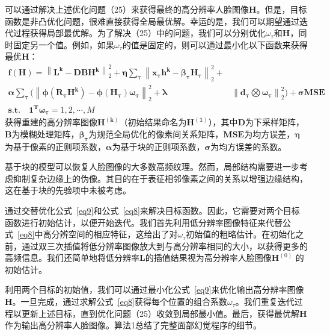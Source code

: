 可以通过解决上述优化问题（25）来获得最终的高分辨率人脸图像$\boldsymbol{H}$。但是，目标函数是非凸优化问题，很难直接获得全局最优解。幸运的是，我们可以期望通过迭代过程获得局部最优解。为了解决（25）中的问题，我们可以分别优化$\omega _{\tau }$和$\boldsymbol{H}$，同时固定另一个值。例如，如果$\omega _{\tau }$的值是固定的，则可以通过最小化以下函数来获得最优$\boldsymbol{H}$：
\begin{equation}
 \label{eq9}
 \begin{split}
   \boldsymbol{f(H)}= \left \| \boldsymbol{L^{k}}-\boldsymbol{DBH^{k}} \right \|_{2}^{2}+\boldsymbol{\eta \sum_{\tau }}\left \| \boldsymbol{x_{\tau }h^{k}}-\boldsymbol{\beta _{\tau }H_{\tau }} \right \|_{2}^{2}+ \\
   \boldsymbol{\alpha \sum_{\tau }}(\left \| \boldsymbol{\phi (R_{\tau }H^{k})}-\boldsymbol{\phi (H_{\tau })\omega _{\tau } }\right \|_{2}^{2}+ \boldsymbol{\lambda} & \left \| \boldsymbol{d_{\tau }}\bigotimes \boldsymbol{\omega _{\tau } }\right \|_{2}^{2})+\boldsymbol{\sigma MSE} \\
   \boldsymbol{s.t. \quad 1^{T}\omega _{\tau }}= 1,2,\cdots ,M \qquad \qquad \qquad \qquad \qquad \quad &
 \end{split}
\end{equation}
获得重建的高分辨率图像$\boldsymbol{H^{(k)}}$（初始结果命名为$\boldsymbol{H^{(1)}}$），其中$\boldsymbol{D}$为下采样矩阵，$\boldsymbol{B}$为模糊处理矩阵，$\boldsymbol{\beta _{\tau }}$为规范全局优化的像素间关系矩阵，$\boldsymbol{MSE}$为均方误差，$\boldsymbol{\eta }$为基于像素的正则项系数，$\boldsymbol{\alpha}$为基于块的正则项系数，$\boldsymbol{\sigma}$为均方误差的系数。

基于块的模型可以恢复人脸图像的大多数高频纹理。然而，局部结构需要进一步考虑抑制复杂边缘上的伪像。其目的在于表征相邻像素之间的关系以增强边缘结构，这在基于块的先验项中未被考虑。

通过交替优化公式~\ref{eq9}和公式~\ref{eq8}来解决目标函数。因此，它需要对两个目标函数进行初始估计，以便开始迭代。我们首先利用低分辨率图像特征来代替公式~\ref{eq8}中高分辨空间的相应特征，这给出了对$\omega _{\tau }$初始值的粗略估计。在初始化之前，通过双三次插值将低分辨率图像放大到与高分辨率相同的大小，以获得更多的高频信息。我们还简单地将低分辨率$\boldsymbol{L}$的插值结果视为高分辨率人脸图像$\mathbf{H}^{(0)}$ 的初始估计。

利用两个目标的初始值，我们可以通过最小化公式~\ref{eq9}来优化输出高分辨率图像$\boldsymbol{H}$。一旦完成，通过求解公式~\ref{eq8}获得每个位置的组合系数$\omega _{\tau }$。我们重复迭代过程以更新上述目标，直到优化问题（25）收敛到局部最小值。最后，获得最优解$\boldsymbol{H}$作为输出高分辨率人脸图像。算法1总结了完整面部幻觉程序的细节。

